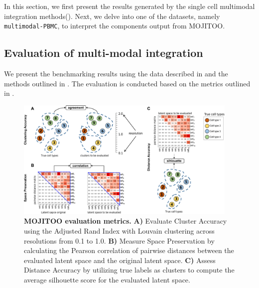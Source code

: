 In this section, we first present the results generated by the single cell multimodal integration methods(). Next, we delve into one of the datasets, namely \texttt{multimodal-PBMC}, to interpret the components output from MOJITOO.

\subsection{Evaluation of multi-modal integration}
\label{MOJITOO:out:bench}

We present the benchmarking results using the data described in  and the methods outlined in . The evaluation is conducted based on the metrics outlined in .

\begin{figure}[!ht]
	\centering
	\includegraphics[width=0.95\textwidth]{MOJITOO_bench_metrics/fig}
	\vspace{0.1cm}
	\caption[MOJITOO evaluation metrics]{
	\textbf{MOJITOO evaluation metrics.}  \textbf{A)} Evaluate Cluster Accuracy using the Adjusted Rand Index with Louvain clustering across resolutions from 0.1 to 1.0. \textbf{B)} Measure Space Preservation by calculating the Pearson correlation of pairwise distances between the evaluated latent space and the original latent space. \textbf{C)} Assess Distance Accuracy by utilizing true labels as clusters to compute the average silhouette score for the evaluated latent space.}
	\label{fig:bench_metrics}
\end{figure}

